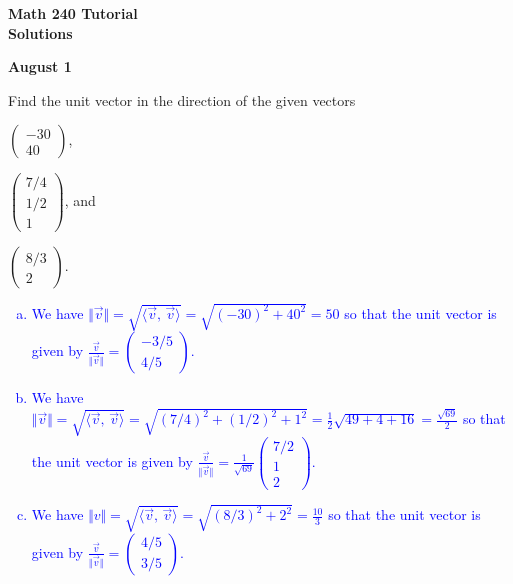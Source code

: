 \documentclass[a4paper,11pt]{article}
\newcommand{\blue}[1]{\textcolor{blue}{#1}}
\begin{document}
\begin{center}
  {\Large\bfseries Math 240 Tutorial \\ Solutions}
\end{center}
\begin{center}
  {\bfseries August 1}
\end{center}

 Find the unit vector in the direction of the given
vectors
\begin{enumerate*}[(a)]
\item $\left( \begin{smallmatrix}-30\\40\end{smallmatrix} \right)$,
\item $\left( \begin{smallmatrix}7/4\\1/2\\1\end{smallmatrix} \right)$, and
\item $\left( \begin{smallmatrix}8/3\\2\end{smallmatrix} \right)$. \\
\end{enumerate*}

\blue{
  \begin{enumerate}[(a)]
  \item We have $\Vert \vec v \Vert = \sqrt{\langle \vec v,\,\vec v \rangle} =
    \sqrt{(-30)^2+40^2} = 50$ so that the unit vector is given by $\frac{\vec
      v}{\Vert \vec v
      \Vert}=\left( \begin{smallmatrix}-3/5\\4/5\end{smallmatrix} \right)$.
  \item We have $\Vert \vec v \Vert = \sqrt{\langle \vec v,\,\vec v \rangle} =
    \sqrt{(7/4)^2+(1/2)^2+1^2} = \frac{1}{2}\sqrt{49+4+16}=\frac{\sqrt{69}}{2}$
    so that the unit vector is given by $\frac{\vec v}{\Vert \vec v
      \Vert}=\frac{1}{\sqrt{69}}\left(
      \begin{smallmatrix}7/2\\1\\2\end{smallmatrix}\right)$.
  \item We have $\Vert v \Vert = \sqrt{\langle \vec v,\,\vec v \rangle} =
    \sqrt{(8/3)^2+2^2} = \frac{10}{3}$ so that the unit vector is given by
    $\frac{\vec v}{\Vert \vec v
      \Vert}=\left( \begin{smallmatrix}4/5\\3/5\end{smallmatrix} \right)$. \\
  \end{enumerate}
}
\end{document}
